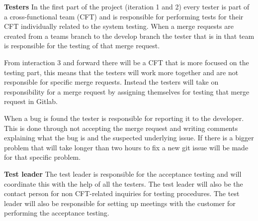 \textbf{Testers}\newline
\noindent In the first part of the project (iteration 1 and 2) every tester is part of a cross-functional team (CFT) and is responsible for performing tests for their CFT individually related to the system testing. When a merge requests are created from a teams branch to the develop branch the tester that is in that team is responsible for the testing of that merge request. \newline

\noindent From interaction 3 and forward there will be a CFT that is more focused on the testing part, this means that the testers will work more together and are not responsible for specific merge requests. Instead the testers will take on responsibility for a merge request by assigning themselves for testing that merge request in Gitlab. \newline

\noindent When a bug is found the tester is responsible for reporting it to the developer. This is done through not accepting the merge request and writing comments explaining what the bug is and the suspected underlying issue. If there is a bigger problem that will take longer than two hours to fix a new git issue will be made for that specific problem. \newline

\noindent \textbf{Test leader}\newline
\noindent The test leader is responsible for  the  acceptance  testing  and  will coordinate  this  with  the  help  of  all  the  testers.  The  test leader will also be the contact person for non CFT-related inquiries for testing procedures. The test leader will also be responsible for setting up meetings with the customer for performing the acceptance testing.
